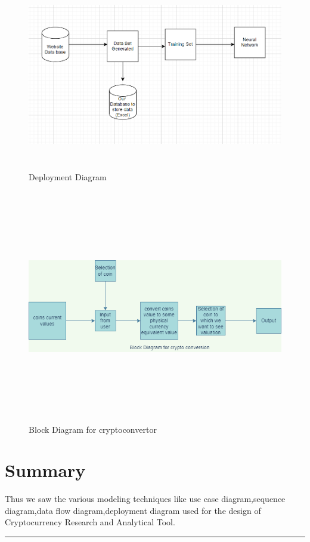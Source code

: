 \documentclass[openany,12pt]{report}
\begin{document}
\begin{figure}[H]
\centering
\includegraphics[width=5in,height=3.3in]{./Deployment.png}
\caption{Deployment Diagram}
\end{figure}

\begin{figure}[H]
\centering
\includegraphics[width=7in,height=4in]{./Cryptoconvertor.png}
\caption{Block Diagram for cryptoconvertor}
\end{figure}




\section{Summary}
Thus we saw the various modeling techniques like use case diagram,sequence diagram,data flow diagram,deployment diagram used for the design of Cryptocurrency Research and Analytical Tool.
\vfill
\hrule
\end{document}
